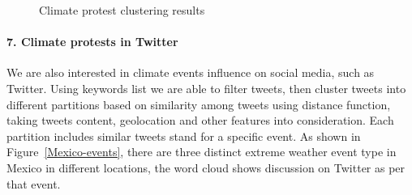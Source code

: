 \documentclass[9pt,twocolumn,twoside]{pnas-new}
\begin{document}
\begin{figure}[ht]
	\centering
	\caption{Climate protest clustering results}
\label{clusters}
\end{figure}



\paragraph{7. Climate protests in Twitter}
We are also interested in climate events influence on social media, such as Twitter. Using keywords list we are able to filter tweets, then cluster tweets into different partitions based on similarity among tweets using distance function, taking tweets content, geolocation and other features into consideration. Each partition includes similar tweets stand for a specific event. As shown in Figure~\ref{Mexico-events}, there are three distinct extreme weather event type in Mexico in different locations, the word cloud shows discussion on Twitter as per that event.
\end{document}
